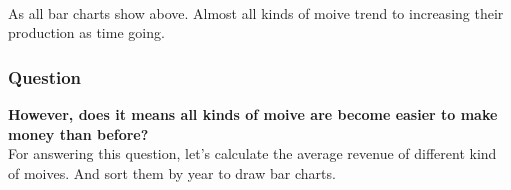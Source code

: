\documentclass[11pt]{article}
\begin{document}
    \begin{center}
    \end{center}
    { \hspace*{\fill} \\}
    
    \begin{center}
    \end{center}
    { \hspace*{\fill} \\}
    
    \begin{center}
    \end{center}
    { \hspace*{\fill} \\}
    
    \begin{center}
    \end{center}
    { \hspace*{\fill} \\}
    
    \begin{center}
    \end{center}
    { \hspace*{\fill} \\}
    
    \begin{center}
    \end{center}
    { \hspace*{\fill} \\}
    
    As all bar charts show above. Almost all kinds of moive trend to
increasing their production as time going.

\subsubsection{Question}\label{question}

\textbf{However, does it means all kinds of moive are become easier to
make money than before?}
\\
For answering this question, let's calculate the average revenue of
different kind of moives. And sort them by year to draw bar charts.
\end{document}
